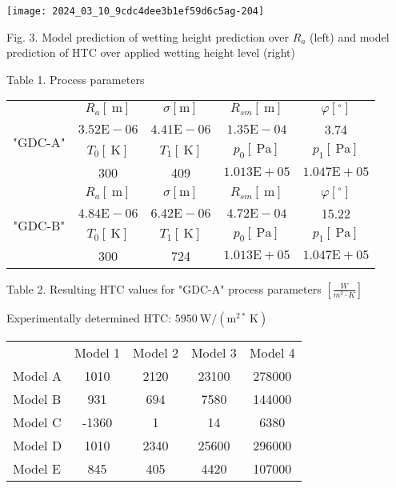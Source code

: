 \documentclass[10pt]{article}
\begin{document}
\begin{center}
\texttt{[image: 2024\_03\_10\_9cdc4dee3b1ef59d6c5ag-204]}
\end{center}

Fig. 3. Model prediction of wetting height prediction over $R_{a}$ (left) and model prediction of HTC over applied wetting height level (right)

Table 1. Process parameters

\begin{center}
\begin{tabular}{|c|cccc|}
\hline
\multirow{4}{*}{"GDC-A"} & $R_{a}[\mathrm{~m}]$ & $\sigma[\mathrm{m}]$ & $R_{s m}[\mathrm{~m}]$ & $\varphi\left[^{\circ}\right]$ \\
\cline { 2 - 5 }
 & $3.52 \mathrm{E}-06$ & $4.41 \mathrm{E}-06$ & $1.35 \mathrm{E}-04$ & 3.74 \\
 & $T_{0}[\mathrm{~K}]$ & $T_{1}[\mathrm{~K}]$ & $p_{0}[\mathrm{~Pa}]$ & $p_{1}[\mathrm{~Pa}]$ \\
\cline { 2 - 5 }
 & 300 & 409 & $1.013 \mathrm{E}+05$ & $1.047 \mathrm{E}+05$ \\
\hline
\multirow{5}{*}{"GDC-B"} & $R_{a}[\mathrm{~m}]$ & $\sigma[\mathrm{m}]$ & $R_{s m}[\mathrm{~m}]$ & $\varphi\left[{ }^{\circ}\right]$ \\
\cline { 2 - 5 }
 & $4.84 \mathrm{E}-06$ & $6.42 \mathrm{E}-06$ & $4.72 \mathrm{E}-04$ & 15.22 \\
 & $T_{0}[\mathrm{~K}]$ & $T_{1}[\mathrm{~K}]$ & $p_{0}[\mathrm{~Pa}]$ & $p_{1}[\mathrm{~Pa}]$ \\
\cline { 2 - 5 }
 & 300 & 724 & $1.013 \mathrm{E}+05$ & $1.047 \mathrm{E}+05$ \\
\hline
\end{tabular}
\end{center}

Table 2. Resulting HTC values for "GDC-A" process parameters $\left[\frac{W}{m^{2} \cdot K}\right]$

Experimentally determined HTC: $5950 \mathrm{~W} /\left(\mathrm{m}^{2 *} \mathrm{~K}\right)$

\begin{center}
\begin{tabular}{l|cccc}
\hline
 & Model 1 & Model 2 & Model 3 & Model 4 \\
\cline { 2 - 5 }
Model A & 1010 & 2120 & 23100 & 278000 \\
Model B & 931 & 694 & 7580 & 144000 \\
Model C & -1360 & 1 & 14 & 6380 \\
Model D & 1010 & 2340 & 25600 & 296000 \\
Model E & 845 & 405 & 4420 & 107000 \\
\hline
\end{tabular}
\end{center}
\end{document}
